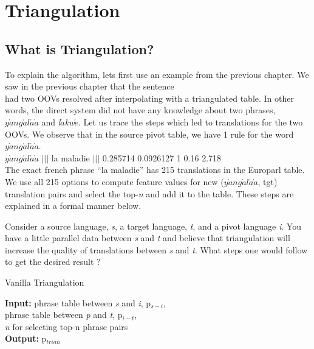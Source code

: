 \chapter{Triangulation}
\label{chap:triangulation}


\section{What is Triangulation?}
\label{sec:triangulation}
To explain the algorithm, lets first use an example from the previous chapter. We saw in the previous chapter that the sentence \mawuexample  \\ had two OOVs resolved after interpolating with a triangulated table. In other words, the direct system did not have any knowledge about two phrases, \emph{$y\grave{a}ng\acute{a}l\acute{a}\grave{a}$} and \emph{l$\acute{a}$kw$\acute{e}$}. Let us trace the steps which led to translations for the two OOVs. We observe that in the source pivot table, we have 1 rule for the word \emph{$y\grave{a}ng\acute{a}l\acute{a}\grave{a}$}. \\

\indent
    \emph{$y\grave{a}ng\acute{a}l\acute{a}\grave{a}$} $|||$ la maladie $|||$ 0.285714 0.0926127 1 0.16 2.718\\

The exact french phrase ``la maladie'' has 215 translations in the Europarl table. We use all 215 options to compute feature values for new (\emph{$y\grave{a}ng\acute{a}l\acute{a}\grave{a}$}, tgt) translation pairs and select the top-\emph{n} and add it to the table. These steps are explained in a formal manner below. 



Consider a source language, \emph{s}, a target language, \emph{t}, and a pivot language \emph{i}. You have a little parallel data between \emph{s} and \emph{t} and believe that triangulation will increase the quality of translations between \emph{s} and \emph{t}. What steps one would follow to get the desired result ?

\begin{algorithm}
\caption{Vanilla Triangulation}
\label{algo:vanilla_triangulation}

\textbf{Input:} phrase table between \emph{s} and \emph{i}, p$_{s-i}$, \\
 phrase table between \emph{p} and \emph{t}, p$_{i-t}$,  \\
 \emph{n} for selecting top-n phrase pairs \\
\textbf{Output:} p$_{trian}$
\begin{algorithmic}[l]
 \label{aline:common}

         \label{aline:computation}
        \ENDFOR
         \label{aline:topn}
        \ENDIF
        \ENDFOR


\end{algorithmic}

\end{algorithm}

